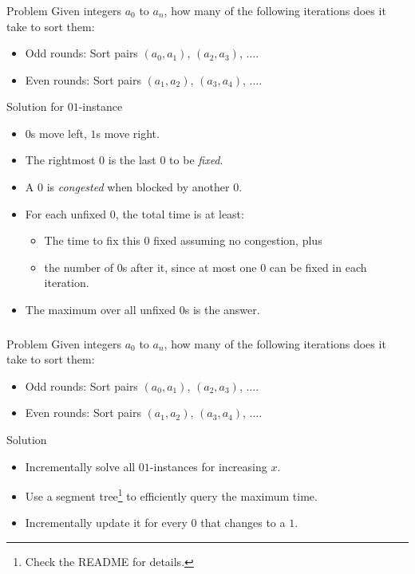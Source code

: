 \begin{frame}
    \frametitle{\problemtitle}
    \begin{block}{Problem}
      Given integers $a_0$ to $a_n$, how many of the following iterations does it take to sort
      them:
      \begin{itemize}
        \item Odd rounds: Sort pairs $(a_0, a_1)$, $(a_2, a_3)$, $\dots$.
        \item Even rounds: Sort pairs $(a_1, a_2)$, $(a_3, a_4)$, $\dots$.
      \end{itemize}
    \end{block}
    \begin{block}{Solution for $01$-instance}
        \begin{itemize}
            \item<+-> $0$s move left, $1$s move right.
            \item<+-> The rightmost $0$ is the last $0$ to be \emph{fixed}.
            \item<+-> A $0$ is \emph{congested} when blocked by another $0$.
          \item<+-> For each unfixed $0$, the total time is at least:
            \begin{itemize}
              \item The time to fix this $0$ fixed assuming no congestion, plus
              \item the number of $0$s after it, since at most one $0$ can be fixed
                    in each iteration.
            \end{itemize}
            \item<+-> The maximum over all unfixed $0$s is the answer.
        \end{itemize}
    \end{block}
    \solvestats
\end{frame}

\begin{frame}
    \frametitle{\problemtitle}
    \begin{block}{Problem}
      Given integers $a_0$ to $a_n$, how many of the following iterations does it take to sort
      them:
      \begin{itemize}
        \item Odd rounds: Sort pairs $(a_0, a_1)$, $(a_2, a_3)$, $\dots$.
        \item Even rounds: Sort pairs $(a_1, a_2)$, $(a_3, a_4)$, $\dots$.
      \end{itemize}
    \end{block}
    \begin{block}{Solution}
        \begin{itemize}
            \item<+-> Incrementally solve all $01$-instances for increasing $x$.
            \item<+-> Use a segment tree\footnote{Check the README for details.} to efficiently query the maximum time.
            \item<+-> Incrementally update it for every $0$ that changes to a $1$.
        \end{itemize}
    \end{block}
    \solvestats
\end{frame}
